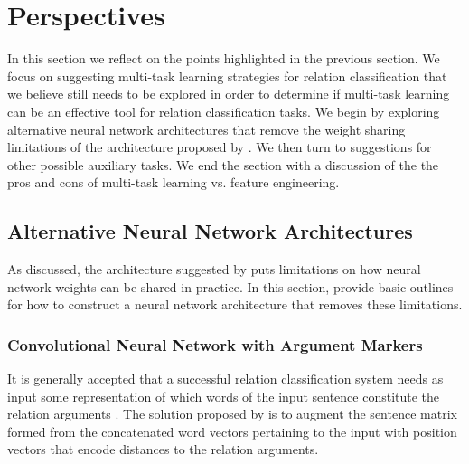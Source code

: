 \chapter{Perspectives}
In this section we reflect on the points highlighted in the previous section. We focus on suggesting multi-task learning strategies for relation classification that we believe still needs to be explored in order to determine if multi-task learning can be an effective tool for relation classification tasks. We begin by exploring alternative neural network architectures that remove the weight sharing limitations of the architecture proposed by \citet{nguyen2015}. We then turn to suggestions for other possible auxiliary tasks. We end the section with a discussion of the the pros and cons of multi-task learning vs. feature engineering.

\section{Alternative Neural Network Architectures}
As discussed, the architecture suggested by \citet{nguyen2015} puts limitations on how neural network weights can be shared in practice. In this section, provide basic outlines for how to construct a neural network architecture that removes these limitations.

\subsection{Convolutional Neural Network with Argument Markers}
\label{marker_strategy}
It is generally accepted that a successful relation classification system needs as input some representation of which words of the input sentence constitute the relation arguments \citep{nguyen2015, zhang2015, jiang2009}. The solution proposed by \citet{nguyen2015} is to augment the sentence matrix formed from the concatenated word vectors pertaining to the input with position vectors that encode distances to the relation arguments. 

